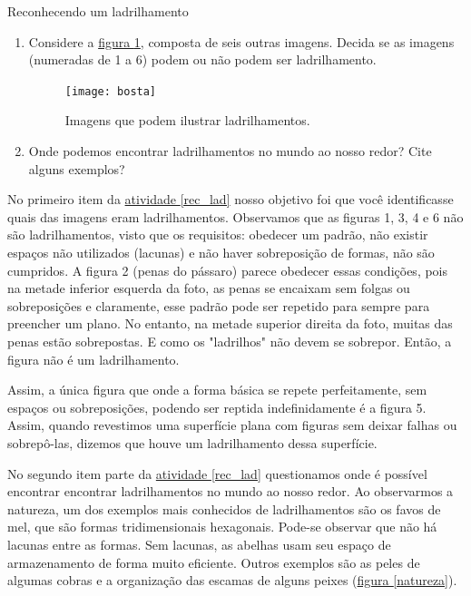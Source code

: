 \begin{task}{Reconhecendo um ladrilhamento} \label{rec_lad}
\begin{enumerate}
\item Considere  a \hyperref[ladr12]{figura \ref{ladr12}}, composta de seis outras imagens. Decida se as imagens (numeradas de 1 a 6) podem ou não podem ser  ladrilhamento.

\begin{figure}[H]
\centering
\texttt{[image: bosta]}
\caption{Imagens que podem ilustrar ladrilhamentos.}
\label{ladr12}
\end{figure}

\item Onde podemos encontrar ladrilhamentos no mundo ao nosso redor? Cite alguns exemplos?

\end{enumerate}

\end{task}




No primeiro item da \hyperref[rec_lad]{atividade \ref{rec_lad}} nosso objetivo foi que você identificasse  quais das imagens eram ladrilhamentos.
Observamos que as figuras 1, 3, 4 e 6 não são ladrilhamentos, visto que os requisitos:  obedecer um padrão, não existir espaços não utilizados (lacunas) e não haver sobreposição de formas, não são cumpridos. A figura 2 (penas do pássaro) parece obedecer essas condições, pois na metade inferior esquerda da foto, as penas se encaixam sem folgas ou sobreposições e claramente, esse padrão pode ser repetido para sempre para preencher um plano. No entanto, na metade superior direita da foto, muitas das penas estão sobrepostas. E como os "ladrilhos" não devem se sobrepor. Então, a figura não é um ladrilhamento.

Assim, a única figura que onde a forma básica se repete perfeitamente, sem espaços ou sobreposições, podendo ser reptida indefinidamente é a figura 5.
Assim,  quando revestimos uma superfície plana com figuras sem deixar falhas ou sobrepô-las, dizemos que houve um ladrilhamento dessa superfície. 

No segundo item parte da  \hyperref[rec_lad]{atividade \ref{rec_lad}} questionamos onde é possível encontrar encontrar ladrilhamentos no mundo ao nosso redor. 
Ao observarmos a natureza, um dos exemplos mais conhecidos de ladrilhamentos são os favos de mel, que são formas tridimensionais hexagonais. Pode-se observar que não há lacunas entre as formas. Sem lacunas, as abelhas usam seu espaço de armazenamento de forma muito eficiente. Outros exemplos são as peles de algumas cobras e a organização das escamas de alguns peixes (\hyperref[natureza]{figura \ref{natureza}}).


